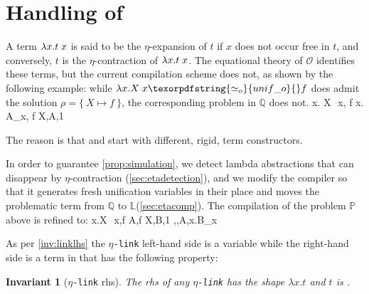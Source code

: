 \documentclass[sigconf,natbib=false,review]{acmart}
\newtheorem{invariant}{Invariant}
\newcommand{\appsep}{\ensuremath{\textcolor{lightgray}{\cdot}}}
\newcommand{\UnifRel}{\ensuremath{\simeq}}
\newcommand{\Uo}{\texorpdfstring{\ensuremath{\UnifRel_o}\xspace}{unif\_o}}
\newcommand{\linkMacro}[1]{\ensuremath{#1}\texttt{-link}\xspace}
\newcommand{\linketa} {\linkMacro{\eta}}
\newcommand{\Fo}{\texorpdfstring{\ensuremath{\mathcal{O}\xspace}}{O}} %
\newcommand{\rhs}{rhs\xspace}
\newcommand{\linkStore}{\texorpdfstring{\ensuremath{\mathbb{L}}\xspace}{L}}
\newcommand{\foUnifPb}{\ensuremath{\mathbb{P}}\xspace}
\newcommand{\hoUnifPb}{\ensuremath{\mathbb{Q}}\xspace}
\begin{document}





\section{Handling of \maybeeta}\label{sec:eta}
A term 
$\lambda x. t \appsep x$ is said to be the $\eta$-expansion of $t$ if
$x$ does not occur free in $t$, and conversely, $t$ is the $\eta$-contraction of
$\lambda x. t \appsep x$. The equational theory of \Fo{} identifies these terms,
but the current compilation scheme does not,
as shown by the following example:
while $\lambda x.X \appsep x \Uo{} f$ does admit the solution
$\rho = \{~ X \mapsto f ~\}$, the corresponding problem in
\hoUnifPb does not.
%
\printAlll
  {{{\lambda x. X \appsep x, f}}}
  {{{\lambda x. A_x, f}}}
  {{{X,A,1}}}
  {{}}

\noindent
The reason is that  and
 start with different, rigid, term constructors.

In order to guarantee \cref{prop:simulation}, we detect
lambda abstractions that can disappear by $\eta$-contraction
(\cref{sec:etadetection}), and we modify the compiler so that it
generates fresh unification variables
in their place and moves the problematic term 
from \hoUnifPb to \linkStore (\cref{sec:etacomp}). The compilation
of the problem \foUnifPb above is refined to: 
%
\printAlll
  {{{\lambda x.X \appsep x,f}}}
  {{{A,f}}}
  {{{X,B,1}}}
  {{{\eta,,A,\lambda x.B_x}}}

\noindent
As per \cref{inv:linklhs} the \linketa left-hand side is a variable
while the right-hand side is a term in \maybeeta that has the following property:

\begin{invariant}[\linketa \rhs]
  The \rhs of any \linketa %
  has the shape $\lambda x.t$
  and $t$ is \wellb. 
  \label{inv:link-eta-right}
\end{invariant}
\end{document}
